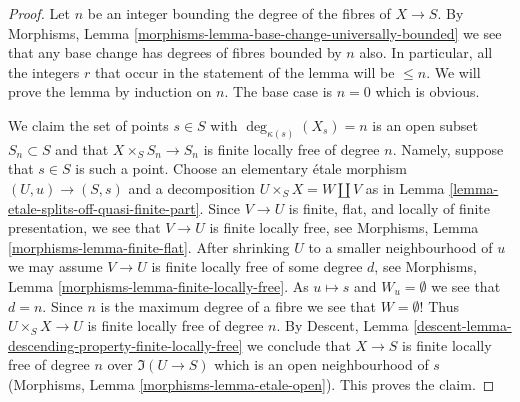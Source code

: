 \begin{proof}
Let $n$ be an integer bounding the degree of the fibres of $X \to S$.
By Morphisms, Lemma \ref{morphisms-lemma-base-change-universally-bounded}
we see that any base change has degrees of fibres bounded by $n$ also.
In particular, all the integers $r$ that occur in the statement of the lemma
will be $\leq n$. We will prove the lemma by induction on $n$. The base
case is $n = 0$ which is obvious.

\medskip\noindent
We claim the set of points $s \in S$
with $\deg_{\kappa(s)}(X_s) = n$ is an open subset $S_n \subset S$
and that $X \times_S S_n \to S_n$ is finite locally free of degree $n$.
Namely, suppose that $s \in S$ is such a point. Choose an elementary
\'etale morphism $(U, u) \to (S, s)$ and a decomposition
$U \times_S X = W \amalg V$ as in
Lemma \ref{lemma-etale-splits-off-quasi-finite-part}.
Since $V \to U$ is finite, flat, and locally of finite presentation,
we see that $V \to U$ is finite locally free, see
Morphisms, Lemma \ref{morphisms-lemma-finite-flat}.
After shrinking $U$ to a smaller neighbourhood of $u$
we may assume $V \to U$ is finite locally free of some degree $d$, see
Morphisms, Lemma \ref{morphisms-lemma-finite-locally-free}.
As $u \mapsto s$ and $W_u = \emptyset$ we see that $d = n$. Since $n$
is the maximum degree of a fibre we see that $W = \emptyset$!
Thus $U \times_S X \to U$ is finite locally free of degree $n$.
By Descent, Lemma \ref{descent-lemma-descending-property-finite-locally-free}
we conclude that $X \to S$ is finite locally free of degree $n$
over $\Im(U \to S)$ which is an open neighbourhood of $s$
(Morphisms, Lemma \ref{morphisms-lemma-etale-open}).
This proves the claim.


\end{proof}

